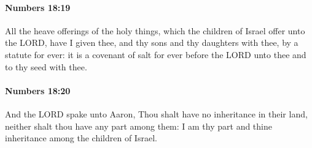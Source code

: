 		\paragraph{Numbers 18:19} %
			\label{NUMBERS-18-19}

			All the heave offerings of the holy things, which the children of Israel offer unto the LORD, have I given thee, and thy sons and thy daughters with thee, by a statute for ever: it is a covenant of salt for ever before the LORD unto thee and to thy seed with thee.


		\paragraph{Numbers 18:20} %
			\label{NUMBERS-18-20}

			And the LORD spake unto Aaron, Thou shalt have no inheritance in their land, neither shalt thou have any part among them: I am thy part and thine inheritance among the children of Israel.

